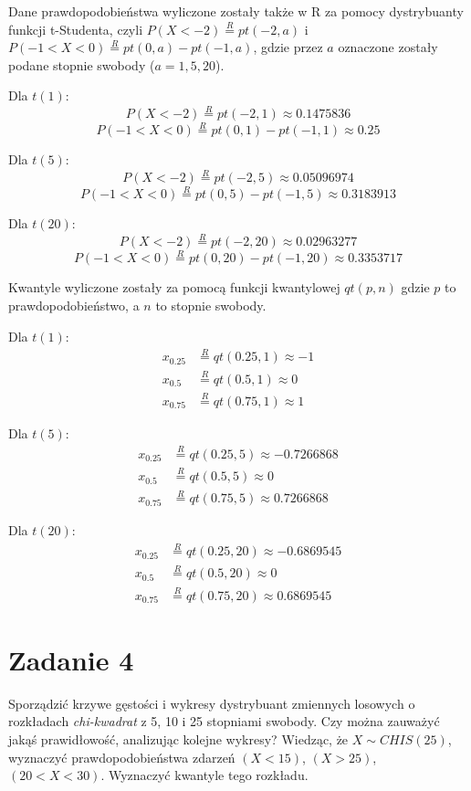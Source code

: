\documentclass{article}
\begin{document}
\newpage
Dane prawdopodobieństwa wyliczone zostały także w R za pomocy dystrybuanty funkcji t-Studenta, czyli $P(X < -2) \overset{R}{=} pt(-2, a)$ i $P(-1 < X < 0) \overset{R}{=} pt(0,a) - pt(-1,a)$, gdzie przez $a$ oznaczone zostały podane stopnie swobody ($a = 1,5,20$).\\
\par
Dla $t(1)$:
\[
P(X < -2) \overset{R}{=} pt(-2, 1)  \approx 0.1475836
\]
\[
P(-1 < X < 0) \overset{R}{=} pt(0, 1) - pt(-1, 1) \approx  0.25
\]

Dla $t(5)$:
\[
P(X < -2) \overset{R}{=} pt(-2, 5)  \approx  0.05096974
\]
\[
P(-1 < X < 0) \overset{R}{=} pt(0, 5) - pt(-1, 5) \approx    0.3183913
\]

Dla $t(20)$:
\[
P(X < -2) \overset{R}{=} pt(-2, 20)  \approx 0.02963277
\]
\[
P(-1 < X < 0) \overset{R}{=} pt(0, 20) - pt(-1, 20) \approx  0.3353717
\]

Kwantyle wyliczone zostały za pomocą funkcji kwantylowej $qt(p, n)$ gdzie $p$ to prawdopodobieństwo, a $n$ to stopnie swobody.\\ \par
Dla $t(1)$:
\begin{align*}
x_{0.25} & \overset{R}{=} qt(0.25, 1) \approx -1 \\
x_{0.5} & \overset{R}{=} qt(0.5, 1) \approx 0 \\
x_{0.75} & \overset{R}{=} qt(0.75, 1) \approx 1
\end{align*}

Dla $t(5)$:
\begin{align*}
x_{0.25} & \overset{R}{=} qt(0.25, 5) \approx -0.7266868 \\
x_{0.5} & \overset{R}{=} qt(0.5, 5) \approx 0 \\
x_{0.75} & \overset{R}{=} qt(0.75, 5) \approx 0.7266868
\end{align*}

Dla $t(20)$:
\begin{align*}
x_{0.25} & \overset{R}{=} qt(0.25, 20) \approx -0.6869545 \\
x_{0.5} & \overset{R}{=} qt(0.5, 20) \approx 0 \\
x_{0.75} & \overset{R}{=} qt(0.75, 20) \approx 0.6869545
\end{align*}

\newpage
\section*{Zadanie 4}
Sporządzić krzywe gęstości i wykresy dystrybuant zmiennych losowych o
rozkładach \textit{chi-kwadrat} z 5, 10 i 25 stopniami swobody. Czy można zauważyć jakąś
prawidłowość, analizując kolejne wykresy? Wiedząc, że $X\sim CHIS(25)$, wyznaczyć
prawdopodobieństwa zdarzeń $(X < 15)$, $(X > 25)$, $(20 < X < 30)$. Wyznaczyć
kwantyle tego rozkładu. \\ \par
\end{document}

